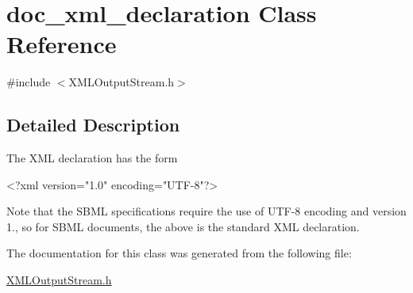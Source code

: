 \hypertarget{classdoc__xml__declaration}{}\section{doc\+\_\+xml\+\_\+declaration Class Reference}
\label{classdoc__xml__declaration}


{\ttfamily \#include $<$X\+M\+L\+Output\+Stream.\+h$>$}



\subsection{Detailed Description}
\begin{DoxyParagraph}{}
The X\+ML declaration has the form \begin{DoxyVerb}<?xml version="1.0" encoding="UTF-8"?>
\end{DoxyVerb}
 Note that the S\+B\+ML specifications require the use of U\+T\+F-\/8 encoding and version 1., so for S\+B\+ML documents, the above is the standard X\+ML declaration. 
\end{DoxyParagraph}


The documentation for this class was generated from the following file\+:\begin{DoxyCompactItemize}
\item 
\hyperlink{_x_m_l_output_stream_8h}{X\+M\+L\+Output\+Stream.\+h}\end{DoxyCompactItemize}

